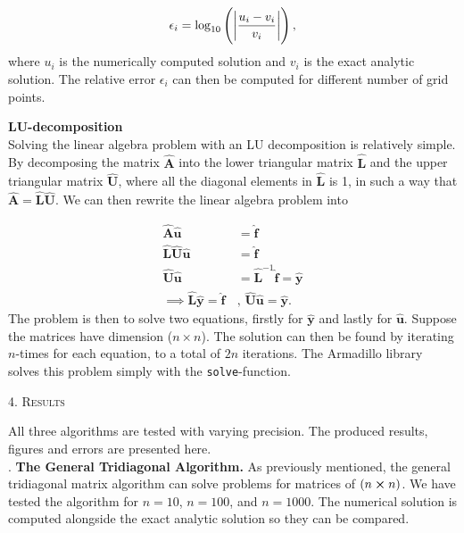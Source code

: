 \documentclass[a4paper,10pt]{article}
\begin{document}
\begin{equation}\label{eq:15}
\epsilon_i = \log_{10} \left( \abs{\frac{u_i - v_i}{v_i}} \right),
\end{equation}
where $u_i$ is the numerically computed solution and $v_i$ is the exact analytic solution. The relative error $\epsilon_i$ can then be computed for different number of grid points.

 \textbf{LU-decomposition} \\
Solving the linear algebra problem with an LU decomposition is relatively simple. By decomposing the matrix $\mathbf{\hat{A}}$ into the lower triangular matrix $\mathbf{\hat{L}}$ and the upper triangular matrix $\mathbf{\hat{U}}$, where all the diagonal elements in $\mathbf{\hat{L}}$ is 1, in such a way that $\mathbf{\hat{A}} = \mathbf{\hat{L}\hat{U}}$. We can then rewrite the linear algebra problem into

\begin{align}
	\mathbf{\hat{A}}\mathbf{\hat{u}} &= \mathbf{\hat{f}} \nonumber\\
	\mathbf{\hat{L}}\mathbf{\hat{U}}\mathbf{\hat{u}} &= \mathbf{\hat{f}} \nonumber\\
	\mathbf{\hat{U}}\mathbf{\hat{u}} &= \mathbf{\hat{L}}^{-1}\mathbf{\hat{f}} = \mathbf{\hat{y}} \nonumber\\
	\implies \mathbf{\hat{L}\hat{y}} = \mathbf{\hat{f}} \, &,\, \mathbf{\hat{U}\hat{u}} = \mathbf{\hat{y}}.
\end{align}
The problem is then to solve two equations, firstly for $\mathbf{\hat{y}}$ and lastly for $\mathbf{\hat{u}}$. Suppose the matrices have dimension ($n\times n$). The solution can then be found by iterating $n$-times for each equation, to a total of $2n$ iterations. The Armadillo library solves this problem simply with the \texttt{solve}-function.

\bigskip

\begin{center}
\textsc{4. Results}
\end{center}

\noindent All three algorithms are tested with varying precision. The produced results, figures and errors are presented here.\\

. \textbf{The General Tridiagonal Algorithm.} As previously mentioned, the general tridiagonal matrix algorithm can solve problems for matrices of $(n \cross n)$. We have tested the algorithm for $n = 10$, $n = 100$, and  $n = 1000$. The numerical solution is computed alongside the exact analytic solution so they can be compared.
\end{document}
